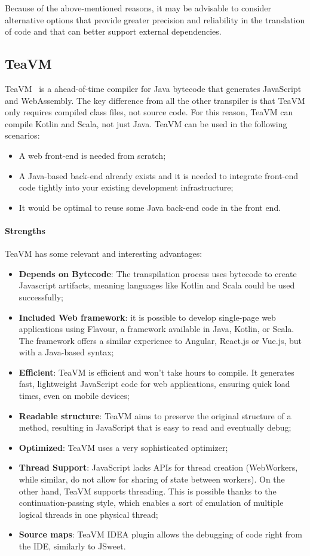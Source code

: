 Because of the above-mentioned reasons, it may be advisable to consider alternative options that provide greater precision and reliability in the translation of code and that can better support external dependencies.

\subsection{TeaVM}
\label{ssec:teavm}
TeaVM~\cite{TeaVM77:online} is a ahead-of-time compiler for Java bytecode that generates JavaScript and WebAssembly. The key difference from all the other transpiler is that TeaVM only requires compiled class files, not source code. For this reason, TeaVM can compile Kotlin and Scala, not just Java. TeaVM can be used in the following scenarios:
\begin{itemize}
	\item A web front-end is needed from scratch;
	\item A Java-based back-end already exists and it is needed to integrate front-end code tightly into your existing development infrastructure;
	\item It would be optimal to reuse some Java back-end code in the front end.
\end{itemize}

\paragraph{Strengths} TeaVM has some relevant and interesting advantages:
\begin{itemize}
	\item \textbf{Depends on Bytecode}: The transpilation process uses bytecode to create Javascript artifacts, meaning languages like Kotlin and Scala could be used successfully;
	\item \textbf{Included Web framework}: it is possible to develop single-page web applications using Flavour, a framework available in Java, Kotlin, or Scala. The framework offers a similar experience to Angular, React.js or Vue.js, but with a Java-based syntax;
	\item \textbf{Efficient}: TeaVM is efficient and won't take hours to compile. It generates fast, lightweight JavaScript code for web applications, ensuring quick load times, even on mobile devices;
	\item \textbf{Readable structure}: TeaVM aims to preserve the original structure of a method, resulting in JavaScript that is easy to read and eventually debug;
	\item \textbf{Optimized}: TeaVM uses a very sophisticated optimizer;
	\item \textbf{Thread Support}: JavaScript lacks APIs for thread creation (WebWorkers, while similar, do not allow for sharing of state between workers). On the other hand, TeaVM supports threading. This is possible thanks to the continuation-passing style, which enables a sort of emulation of multiple logical threads in one physical thread;
	\item \textbf{Source maps}: TeaVM IDEA plugin allows the debugging of code right from the IDE, similarly to JSweet.
\end{itemize}
